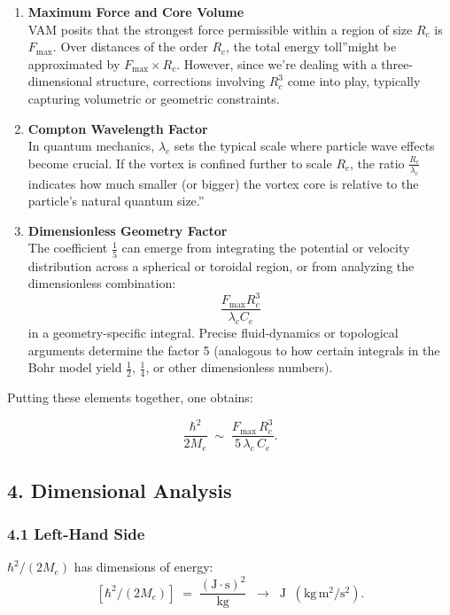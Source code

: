 \documentclass[a4paper,12pt]{article}
\begin{document}
\begin{enumerate}
    \item \textbf{Maximum Force and Core Volume} \\
    VAM posits that the strongest force permissible within a region of size \(R_c\) is \(F_{\max}\). Over distances of the order \(R_c\), the total \grqq energy toll\textquotedblright might be approximated by \(F_{\max} \times R_c\). However, since we're dealing with a three-dimensional structure, corrections involving \(R_c^3\) come into play, typically capturing volumetric or geometric constraints.
    \item \textbf{Compton Wavelength Factor} \\
    In quantum mechanics, \(\lambda_c\) sets the typical scale where particle wave effects become crucial. If the vortex is confined further to scale \(R_c\), the ratio \(\tfrac{R_c}{\lambda_c}\) indicates how much smaller (or bigger) the vortex core is relative to the particle's natural quantum \grqq size.\textquotedblright
    \item \textbf{Dimensionless Geometry Factor} \\
    The coefficient \(\frac{1}{5}\) can emerge from integrating the potential or velocity distribution across a spherical or toroidal region, or from analyzing the dimensionless combination:
    \[
        \frac{F_{\max} R_c^3}{\lambda_c C_e}
    \]
    in a geometry-specific integral. Precise fluid-dynamics or topological arguments determine the factor 5 (analogous to how certain integrals in the Bohr model yield \(\tfrac12\), \(\tfrac14\), or other dimensionless numbers).
\end{enumerate}

Putting these elements together, one obtains:

\[
    \frac{\hbar^2}{2M_e}
    \;\sim\;
    \frac{F_{\max} \,R_c^3}{5 \,\lambda_c \,C_e}.
\]

\subsection*{4. Dimensional Analysis}

\subsubsection*{4.1 Left-Hand Side}
\(\hbar^2/(2 M_e)\) has dimensions of energy:
\[
    [\hbar^2/(2 M_e)]
    \;=\;
    \frac{(\mathrm{J\cdot s})^2}{\mathrm{kg}}
    \;\;\rightarrow\;\;
    \mathrm{J} \;\;(\mathrm{kg\,m^2/s^2}).
\]
\end{document}
